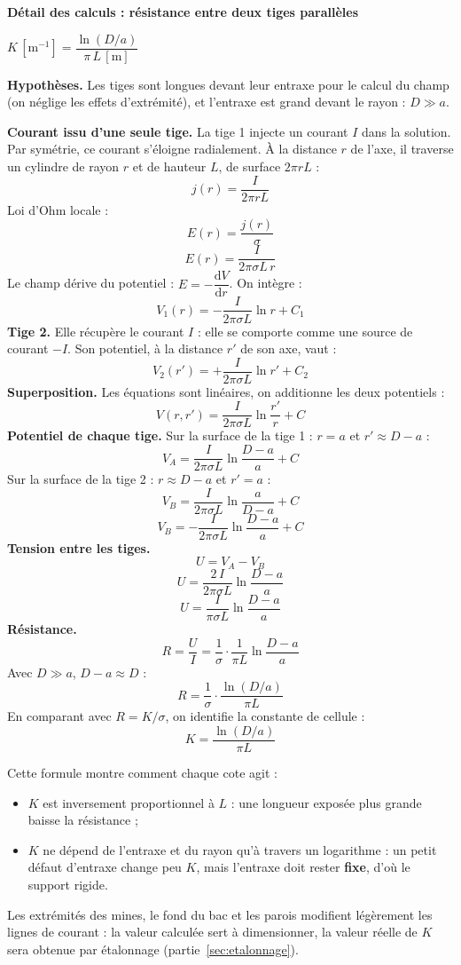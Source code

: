 \documentclass[11pt,a4paper]{article}
\newcommand{\resultat}[1]{\begin{center}{\large\color{bleuENO}$\displaystyle #1$}\end{center}}
\newenvironment{demo}[2]{\par\medskip\noindent\textbf{Détail des calculs : #1}\par\nopagebreak\resultat{#2}}{\par\medskip}
\begin{document}
\begin{demo}{résistance entre deux tiges parallèles}{K\,[\mathrm{m^{-1}}] = \dfrac{\ln(D/a)}{\pi \, L\,[\mathrm{m}]}}
\textbf{Hypothèses.} Les tiges sont longues devant leur entraxe pour le calcul du champ (on néglige les effets d'extrémité), et l'entraxe est grand devant le rayon : $D \gg a$.

\textbf{Courant issu d'une seule tige.} La tige 1 injecte un courant $I$ dans la solution. Par symétrie, ce courant s'éloigne radialement. À la distance $r$ de l'axe, il traverse un cylindre de rayon $r$ et de hauteur $L$, de surface $2 \pi r L$ :
\[
j(r) = \frac{I}{2 \pi r L}
\]
Loi d'Ohm locale :
\[
E(r) = \frac{j(r)}{\sigma}
\]
\[
E(r) = \frac{I}{2 \pi \sigma L \, r}
\]
Le champ dérive du potentiel : $E = -\dfrac{\mathrm{d}V}{\mathrm{d}r}$. On intègre :
\[
V_1(r) = -\frac{I}{2 \pi \sigma L} \ln r + C_1
\]
\textbf{Tige 2.} Elle récupère le courant $I$ : elle se comporte comme une source de courant $-I$. Son potentiel, à la distance $r'$ de son axe, vaut :
\[
V_2(r') = +\frac{I}{2 \pi \sigma L} \ln r' + C_2
\]
\textbf{Superposition.} Les équations sont linéaires, on additionne les deux potentiels :
\[
V(r, r') = \frac{I}{2 \pi \sigma L} \ln \frac{r'}{r} + C
\]
\textbf{Potentiel de chaque tige.} Sur la surface de la tige 1 : $r = a$ et $r' \approx D - a$ :
\[
V_A = \frac{I}{2 \pi \sigma L} \ln \frac{D - a}{a} + C
\]
Sur la surface de la tige 2 : $r \approx D - a$ et $r' = a$ :
\[
V_B = \frac{I}{2 \pi \sigma L} \ln \frac{a}{D - a} + C
\]
\[
V_B = -\frac{I}{2 \pi \sigma L} \ln \frac{D - a}{a} + C
\]
\textbf{Tension entre les tiges.}
\[
U = V_A - V_B
\]
\[
U = \frac{2 \, I}{2 \pi \sigma L} \ln \frac{D - a}{a}
\]
\[
U = \frac{I}{\pi \sigma L} \ln \frac{D - a}{a}
\]
\textbf{Résistance.}
\[
R = \frac{U}{I} = \frac{1}{\sigma} \cdot \frac{1}{\pi L} \ln \frac{D - a}{a}
\]
Avec $D \gg a$, $D - a \approx D$ :
\[
R = \frac{1}{\sigma} \cdot \frac{\ln(D / a)}{\pi L}
\]
En comparant avec $R = K / \sigma$, on identifie la constante de cellule :
\[
K = \frac{\ln(D / a)}{\pi L}
\]
\end{demo}

Cette formule montre comment chaque cote agit :
\begin{itemize}[nosep]
\item $K$ est inversement proportionnel à $L$ : une longueur exposée plus grande baisse la résistance ;
\item $K$ ne dépend de l'entraxe et du rayon qu'à travers un logarithme : un petit défaut d'entraxe change peu $K$, mais l'entraxe doit rester \textbf{fixe}, d'où le support rigide.
\end{itemize}
Les extrémités des mines, le fond du bac et les parois modifient légèrement les lignes de courant : la valeur calculée sert à dimensionner, la valeur réelle de $K$ sera obtenue par étalonnage (partie~\ref{sec:etalonnage}).
\end{document}
